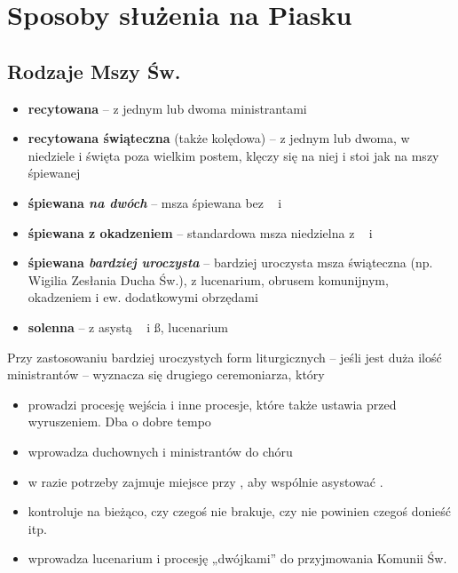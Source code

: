 
\section{Sposoby służenia na Piasku}

\subsection{Rodzaje Mszy Św.}

\begin{itemize}
	\item \textbf{recytowana} -- z jednym lub dwoma ministrantami
	\item \textbf{recytowana świąteczna} (także kolędowa) -- z jednym lub dwoma,
	      w niedziele i święta poza wielkim postem, klęczy się na niej i stoi
	      jak na mszy śpiewanej
	\item \textbf{śpiewana \textit{na dwóch}} -- msza śpiewana bez \cc~ i \tt~
	\item \textbf{śpiewana z okadzeniem} -- standardowa msza niedzielna z \cc~ i
	      \tt~
	\item \textbf{ śpiewana \textit{bardziej uroczysta}} -- bardziej uroczysta
	      msza świąteczna	(np. Wigilia Zesłania Ducha Św.), z lucenarium,
	      obrusem komunijnym, okadzeniem i ew. dodatkowymi obrzędami
	\item \textbf{solenna} -- z asystą \dd~ i \ss, lucenarium
\end{itemize}

\noindent Przy zastosowaniu bardziej uroczystych form liturgicznych -- jeśli
jest duża ilość ministrantów -- wyznacza się drugiego ceremoniarza, który
\begin{itemize}
	\item prowadzi procesję wejścia i inne procesje, które także ustawia przed
	      wyruszeniem. Dba o dobre tempo
	\item wprowadza duchownych i ministrantów do chóru
	\item w razie potrzeby zajmuje miejsce przy , aby wspólnie asystować
	      \ii.
	\item kontroluje na bieżąco, czy czegoś nie brakuje, czy nie powinien czegoś
	      donieść itp.
	\item wprowadza lucenarium i procesję „dwójkami” do przyjmowania Komunii Św.
\end{itemize}
